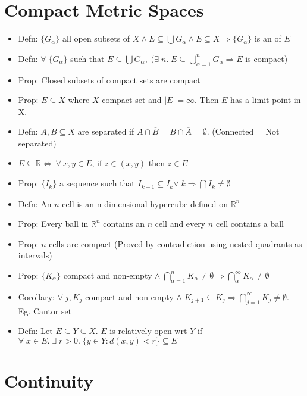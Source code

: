 \documentclass[11pt]{article}
\newcommand{\boxinate}[1]{\framebox[1.1\width]{#1}}
\begin{document}
\section{Compact Metric Spaces} %
\begin{itemize}
\item Defn: $\{G_{\alpha}\}$ all open subsets of $X \land E \subseteq \bigcup
  G_{\alpha} \land E \subseteq X \Rightarrow \{G_{\alpha}\}$ is an
  \boxinate{open cover} of $E$

\item Defn: $\forall\;\{G_{\alpha}\}$ such that $E \subseteq \bigcup G_{\alpha}
  ,\;(\exists\;n.\; E \subseteq \bigcup_{\alpha = 1}^n G_{\alpha} \Rightarrow
  E$ is compact)
\item Prop: Closed subsets of compact sets are compact
\item Prop: $E \subseteq X$ where $X$ compact set and $|E| = \infty$. Then $E$ has a limit point in X. 
\item Defn: $A, B \subseteq X$ are separated if $A \cap \overline{B} = B \cap
  \overline{A} = \emptyset$. (Connected = Not separated)
\item $E \subseteq \mathbb{R} \iff ~\forall~x,y \in E$, if $z \in (x, y)$ then
  $z \in E$
\item Prop: $\{I_k\}$ a sequence such that $I_{k+1} \subseteq I_k \forall\;k
  \Rightarrow \bigcap I_k \neq \emptyset$
\item Defn: An $n$ cell is an n-dimensional hypercube defined on $\mathbb{R}^n$
\item Prop: Every ball in $\mathbb{R}^n$ contains an $n$ cell and every $n$
  cell contains a ball
\item Prop: $n$ cells are compact (Proved by contradiction using nested
  quadrants as intervals)
\item Prop: $\{K_{\alpha}\}$ compact and non-empty $\land\; \bigcap_{\alpha =
  1}^n K_{\alpha} \neq \emptyset \Rightarrow \bigcap_{\alpha}^{\infty}
  K_{\alpha} \neq \emptyset$
\item Corollary: $\forall\;j, K_j$ compact and non-empty $\land \;K_{j+1}
  \subseteq K_j \Rightarrow \bigcap_{j=1}^{\infty} K_j \neq
  \emptyset$. Eg. Cantor set
\item Defn: Let $E \subseteq Y \subseteq X$. $E$ is relatively open wrt $Y$ if
  $\forall\;x \in E.\;\exists\;r > 0.\;\{y \in Y: d(x, y) < r\} \subseteq E$
\end{itemize}

\section{Continuity}
\end{document}
